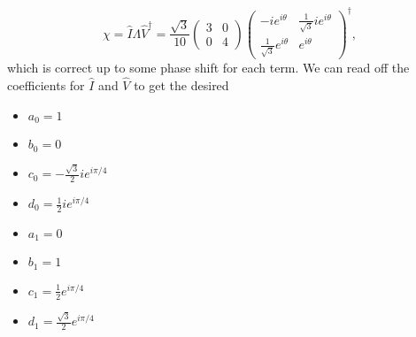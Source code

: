 \documentclass{article}
\numberwithin{equation}{section}
\begin{document}
\begin{enumerate}
    \begin{equation}
        \chi = \hat{I}\Lambda\hat{V}^\dagger = \frac{\sqrt{3}}{10}\begin{pmatrix}
            3 & 0 \\ 
            0 & 4
        \end{pmatrix}\begin{pmatrix}
            -ie^{i\theta} & \frac{1}{\sqrt{3}} ie^{i\theta} \\ 
            \frac{1}{\sqrt{3}}e^{i\theta} & e^{i\theta}
        \end{pmatrix}^\dagger,
    \end{equation}
    which is correct up to some phase shift for each term. We can read off the coefficients for $\hat{I}$ and $\hat{V}$ to get the desired
    \begin{itemize}
        \item $a_0 = 1$
        \item $b_0 = 0$
        \item $c_0 = -\frac{\sqrt{3}}{2}ie^{i\pi/4}$
        \item $d_0 = \frac{1}{2}ie^{i\pi/4}$
        \item $a_1 = 0$
        \item $b_1 = 1$
        \item $c_1 = \frac{1}{2}e^{i\pi/4}$
        \item $d_1 = \frac{\sqrt{3}}{2} e^{i\pi/4}$
    \end{itemize}
\end{enumerate}
\end{document}
